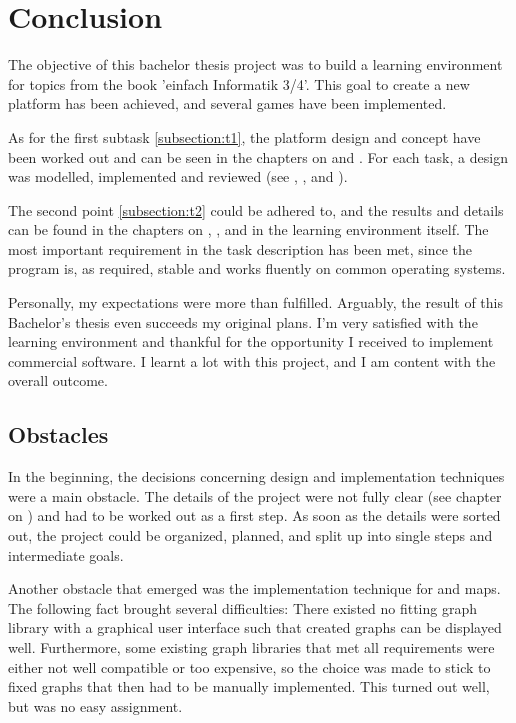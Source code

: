 \chapter{Conclusion}
\label{chapter:conclusion}
The objective of this bachelor thesis project was to build a learning environment for topics from the book 'einfach Informatik 3/4'. This goal to create a new platform has been achieved, and several games have been implemented. 

As for the first subtask \ref{subsection:t1}, the platform design and concept have been worked out and can be seen in the chapters on  and . For each task, a design was modelled, implemented and reviewed (see , , and ).

The second point \ref{subsection:t2} could be adhered to, and the results and details can be found in the chapters on , ,  and in the learning environment itself. The most important requirement in the task description has been met, since the program is, as required, stable and works fluently on common operating systems.

Personally, my expectations were more than fulfilled. Arguably, the result of this Bachelor's thesis even succeeds my original plans. I'm very satisfied with the learning environment and thankful for the opportunity I received to implement commercial software. I learnt a lot with this project, and I am content with the overall outcome.

\section{Obstacles}
\label{section:obstacles}
In the beginning, the decisions concerning design and implementation techniques were a main obstacle. The details of the project were not fully clear (see chapter on ) and had to be worked out as a first step. As soon as the details were sorted out, the project could be organized, planned, and split up into single steps and intermediate goals.

Another obstacle that emerged was the implementation technique for  and  maps. The following fact brought several difficulties: There existed no fitting graph library with a graphical user interface such that created graphs can be displayed well. Furthermore, some existing graph libraries that met all requirements were either not well compatible or too expensive, so the choice was made to stick to fixed graphs that then had to be manually implemented. This turned out well, but was no easy assignment.

